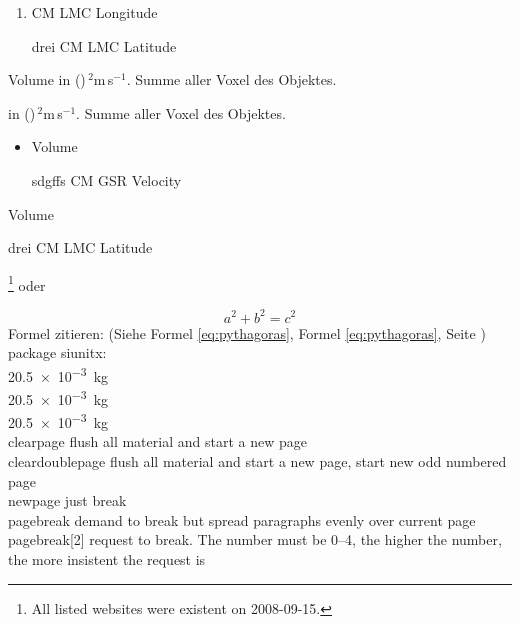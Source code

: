 \begin{enumerate}
	\item CM LMC Longitude
	\item [drei] CM LMC Latitude
\end{enumerate}

\begin{description}
  	\item Volume in (\textdegree)\,$^2$m\,s$^{-1}$. Summe aller Voxel des Objektes.
  	\item [Volume] in (\textdegree)\,$^2$m\,s$^{-1}$. Summe aller Voxel des Objektes.
\end{description}

\begin{itemize}
 	\item Volume
	\item [sdgffs] CM GSR Velocity
\end{itemize}

\begin{list}{asdf}{}
 	\item Volume
	\item [drei] CM LMC Latitude
\end{list}

\footnote{All listed websites were existent on 2008-09-15.} oder \footnotemark {}

\begin{equation}
	a^2 + b^2 = c^2
	\label{eq:pythagoras} 
\end{equation}
Formel zitieren: (Siehe Formel \ref{eq:pythagoras}, Formel \eqref{eq:pythagoras}, Seite \pageref{eq:pythagoras})\\

package siunitx:\\
\SI{20.5e-3}{\kilo\gram}\\
\SI{20.5e-3}{\kg}\\
\SI{20.5e-3}{kg}\\

clearpage	flush all material and start a new page\\
cleardoublepage	flush all material and start a new page, start new odd numbered page\\
newpage		just break\\
pagebreak	demand to break but spread paragraphs evenly over current page\\
pagebreak[2]	request to break. The number must be 0--4, the higher the number, the more insistent the request is\\

